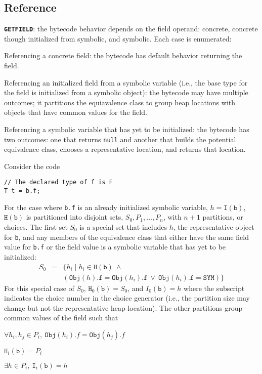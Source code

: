 \subsection{Reference}
\noindent \textbf{\texttt{GETFIELD}}: the bytecode behavior depends on the field operand: concrete, concrete though initialized from symbolic, and symbolic. Each case is enumerated:
\begin{compactenum}
\item Referencing a concrete field: the bytecode has default behavior returning the field.
\item Referencing an initialized field from a symbolic variable (i.e., the base type for the field is initialized from a symbolic object): the bytecode may have multiple outcomes; it partitions the equiavalence class to group heap locations with objects that have common values for the field.
\item Referencing a symbolic variable that has yet to be initialized: the bytecode has two outcomes: one that returns \texttt{null} and another that builds the potential equivalence class, chooses a representative location, and returns that location.
\end{compactenum}
Consider the code
\begin{lstlisting}
// The declared type of f is F
T t = b.f;
\end{lstlisting}
For the case where \texttt{b.f} is an already initialized symbolic variable, $h = \mathtt{I}(\mathtt{b})$, $\mathtt{H}(\mathtt{b})$ is partitioned into disjoint sets, $S_0, P_1, \ldots, P_n$, with $n+1$ partitions, or choices. The first set $S_0$ is a special set that includes $h$, the representative object for \texttt{b}, and any members of the equivalence class that either have the same field value for \texttt{b.f} or the field value is a symbolic variable that has yet to be initialized:
\begin{eqnarray*}
S_0 &=& \{h_i \mid h_i \in \mathtt{H}(\mathtt{b})\ \wedge \\
    & & (\mathtt{Obj}(h).\mathtt{f} = \mathtt{Obj}(h_i).\mathtt{f}\ \vee\ \mathtt{Obj}(h_i).\mathtt{f} = \mathtt{SYM})\}
\end{eqnarray*}
For this special case of $S_0$,  $\mathtt{H}_0(\mathtt{b}) = S_0$, and $I_0(\mathtt{b}) = h$ where the subscript indicates the choice number in the choice generator (i.e., the partition size may change but not the representative heap location). The other partitions group common values of the field such that
\begin{compactitem}
\item $\forall h_i, h_j \in P_i,\ \mathtt{Obj}(h_i).f = \mathtt{Obj}(h_j).f$ 
\item $\mathtt{H}_i(\mathtt{b}) = P_i$ 
\item $\exists h \in P_i,\ \mathtt{I}_i(\mathtt{b}) = h$
\end{compactitem}
